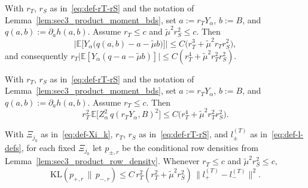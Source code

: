 \documentclass[10pt,a4paper]{amsart}
\newcommand{\Ebb}{\mathbb E}
\newcommand{\KL}{\mathrm{KL}}
\newcommand{\trg}{T}
\begin{document}
\begin{lemma}
\label{lem:sec3_product_approx_error}
With $r_T$, $r_S$ as in~\eqref{eq:def-rT-rS} and the notation of
Lemma~\ref{lem:sec3_product_moment_bds}, set $a:=r_T Y_\alpha$, $b:=B$,
and $q(a,b):=\partial_a h(a,b)$.  Assume $r_T\le c$ and
$\tilde\mu^2 r_S^2\le c$.  Then
\begin{equation}
\label{eq:sec3_product_approx_error}
    \bigl|\Ebb\bigl[Y_\alpha\bigl(q(a,b)-a-\tilde\mu b\bigr)\bigr]\bigr|
    \le
    C\bigl(r_T^3+\tilde\mu^2 r_T r_S^2\bigr),
\end{equation}
and consequently
$r_T\bigl|\Ebb[Y_\alpha(q-a-\tilde\mu b)]\bigr|\le C(r_T^4+\tilde\mu^2 r_T^2 r_S^2)$.
\end{lemma}

\begin{lemma}
\label{lem:sec3_product_score_sq}
With $r_T$, $r_S$ as in~\eqref{eq:def-rT-rS} and the notation of
Lemma~\ref{lem:sec3_product_moment_bds}, set $a:=r_T Y_\alpha$, $b:=B$,
and $q(a,b):=\partial_a h(a,b)$.  Assume $r_T\le c$.  Then
\begin{equation}
\label{eq:sec3_product_score_sq}
    r_T^2\,\Ebb\!\bigl[Z_\alpha^2\,q(r_T Y_\alpha,B)^2\bigr]
    \le
    C\bigl(r_T^4+\tilde\mu^2 r_T^2 r_S^2\bigr).
\end{equation}
\end{lemma}

\begin{lemma}
\label{lem:sec3_product_row_kl}
With $\Xi_{j_0}$ as in~\eqref{eq:def-Xi_k}, $r_T$, $r_S$ as in~\eqref{eq:def-rT-rS}, and $l^{(\trg)}_\pm$ as in~\eqref{eq:def-l-defs},
for each fixed $\Xi_{j_0}$ let $p_{\pm,r}$ be the conditional row densities from
Lemma~\ref{lem:sec3_product_row_density}.  Whenever $r_T\le c$ and
$\tilde\mu^2 r_S^2\le c$,
\begin{equation}
\label{eq:sec3_product_row_kl}
    \KL(p_{+,r}\,\|\,p_{-,r})
    \le
    C\,r_T^2(r_T^2+\tilde\mu^2 r_S^2)\,\|l^{(\trg)}_+-l^{(\trg)}_-\|^2.
\end{equation}
\end{lemma}
\end{document}
